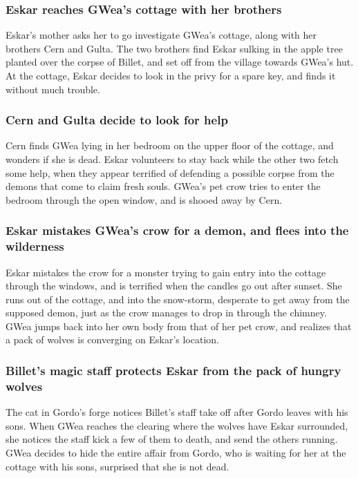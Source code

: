 \subsubsection{\Gls{Eskar} reaches \Gls{GWea}'s cottage with her brothers}
\Gls{Eskar}'s mother asks her to go investigate \Gls{GWea}'s cottage, along with her brothers
\Gls{Cern} and \Gls{Gulta}. The two brothers find \Gls{Eskar} sulking in the apple tree planted over
the corpse of \Gls{Billet}, and set off from the village towards \Gls{GWea}'s hut. At the cottage,
\Gls{Eskar} decides to look in the privy for a spare key, and finds it without much trouble.

\subsubsection{\Gls{Cern} and \Gls{Gulta} decide to look for help}
\Gls{Cern} finds \Gls{GWea} lying in her bedroom on the upper floor of the cottage, and wonders if
she is dead. \Gls{Eskar} volunteers to stay back while the other two fetch some help, when they
appear terrified of defending a possible corpse from the demons that come to claim fresh souls.
\Gls{GWea}'s pet crow tries to enter the bedroom through the open window, and is shooed away by
\Gls{Cern}.

\subsubsection{\Gls{Eskar} mistakes \Gls{GWea}'s crow for a demon, and flees into the wilderness}
\Gls{Eskar} mistakes the crow for a monster trying to gain entry into the cottage through the
windows, and is terrified when the candles go out after sunset. She runs out of the cottage, and
into the snow-storm, desperate to get away from the supposed demon, just as the crow manages to
drop in through the chimney. \Gls{GWea} jumps back into her own body from that of her pet crow,
and realizes that a pack of wolves is converging on \Gls{Eskar}'s location.

\subsubsection{\Gls{Billet}'s magic staff protects \Gls{Eskar} from the pack of hungry wolves}
The cat in \Gls{Gordo}'s forge notices \Gls{Billet}'s staff take off after \Gls{Gordo} leaves with
his sons. When \Gls{GWea} reaches the clearing where the wolves have \Gls{Eskar} surrounded, she
notices the staff kick a few of them to death, and send the others running. \Gls{GWea} decides to
hide the entire affair from \Gls{Gordo}, who is waiting for her at the cottage with his sons,
surprised that she is not dead.

